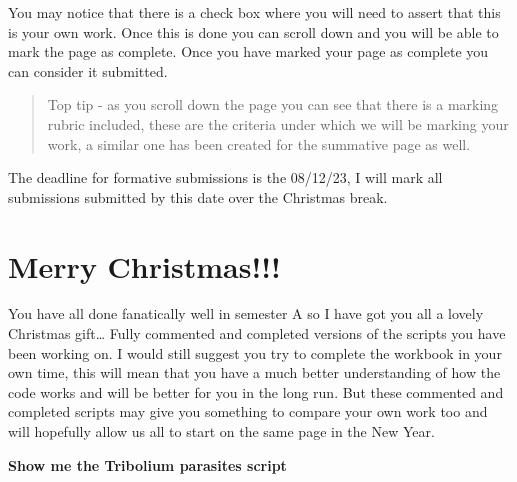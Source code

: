 \documentclass[
]{book}
\begin{document}
You may notice that there is a check box where you will need to assert that this is your own work. Once this is done you can scroll down and you will be able to mark the page as complete. Once you have marked your page as complete you can consider it submitted.

\begin{quote}
Top tip - as you scroll down the page you can see that there is a marking rubric included, these are the criteria under which we will be marking your work, a similar one has been created for the summative page as well.
\end{quote}

The deadline for formative submissions is the 08/12/23, I will mark all submissions submitted by this date over the Christmas break.

\hypertarget{code}{%
\chapter{Merry Christmas!!!}\label{code}}

You have all done fanatically well in semester A so I have got you all a lovely Christmas gift\ldots{} Fully commented and completed versions of the scripts you have been working on. I would still suggest you try to complete the workbook in your own time, this will mean that you have a much better understanding of how the code works and will be better for you in the long run. But these commented and completed scripts may give you something to compare your own work too and will hopefully allow us all to start on the same page in the New Year.

\textbf{Show me the Tribolium parasites script}
\end{document}
